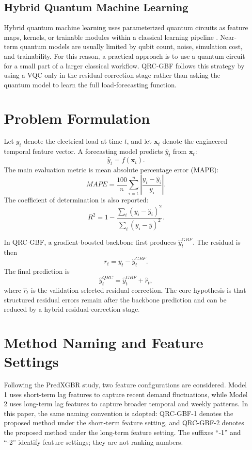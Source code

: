 \documentclass[11pt]{article}
\begin{document}
\subsection{Hybrid Quantum Machine Learning}
Hybrid quantum machine learning uses parameterized quantum circuits as feature maps, kernels, or trainable modules within a classical learning pipeline \cite{biamonte2017quantum,schuld2019quantum,cerezo2021variational}. Near-term quantum models are usually limited by qubit count, noise, simulation cost, and trainability. For this reason, a practical approach is to use a quantum circuit for a small part of a larger classical workflow. QRC-GBF follows this strategy by using a VQC only in the residual-correction stage rather than asking the quantum model to learn the full load-forecasting function.

\section{Problem Formulation}
Let $y_t$ denote the electrical load at time $t$, and let $\mathbf{x}_t$ denote the engineered temporal feature vector. A forecasting model predicts $\hat{y}_t$ from $\mathbf{x}_t$:
\begin{equation}
\hat{y}_t = f(\mathbf{x}_t).
\end{equation}
The main evaluation metric is mean absolute percentage error (MAPE):
\begin{equation}
MAPE = \frac{100}{n}\sum_{i=1}^{n}\left|\frac{y_i - \hat{y}_i}{y_i}\right|.
\end{equation}
The coefficient of determination is also reported:
\begin{equation}
R^2 = 1 - \frac{\sum_i (y_i - \hat{y}_i)^2}{\sum_i (y_i - \bar{y})^2}.
\end{equation}

In QRC-GBF, a gradient-boosted backbone first produces $\hat{y}^{GBF}_t$. The residual is then
\begin{equation}
r_t = y_t - \hat{y}^{GBF}_t.
\end{equation}
The final prediction is
\begin{equation}
\hat{y}^{QRC}_t = \hat{y}^{GBF}_t + \hat{r}_t,
\end{equation}
where $\hat{r}_t$ is the validation-selected residual correction. The core hypothesis is that structured residual errors remain after the backbone prediction and can be reduced by a hybrid residual-correction stage.

\section{Method Naming and Feature Settings}
Following the PredXGBR study, two feature configurations are considered. Model 1 uses short-term lag features to capture recent demand fluctuations, while Model 2 uses long-term lag features to capture broader temporal and weekly patterns. In this paper, the same naming convention is adopted: QRC-GBF-1 denotes the proposed method under the short-term feature setting, and QRC-GBF-2 denotes the proposed method under the long-term feature setting. The suffixes ``-1'' and ``-2'' identify feature settings; they are not ranking numbers.
\end{document}
